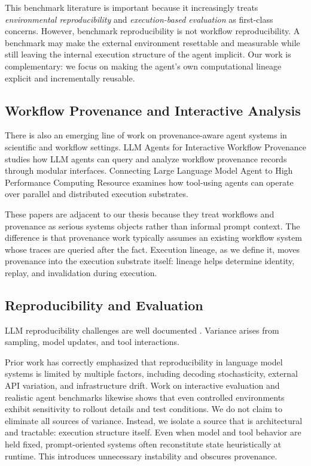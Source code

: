 \documentclass{article}
\begin{document}
This benchmark literature is important because it increasingly treats \emph{environmental reproducibility} and \emph{execution-based evaluation} as first-class concerns. However, benchmark reproducibility is not workflow reproducibility. A benchmark may make the external environment resettable and measurable while still leaving the internal execution structure of the agent implicit. Our work is complementary: we focus on making the agent's own computational lineage explicit and incrementally reusable.

\subsection{Workflow Provenance and Interactive Analysis}

There is also an emerging line of work on provenance-aware agent systems in scientific and workflow settings. LLM Agents for Interactive Workflow Provenance \cite{souza2025provenance} studies how LLM agents can query and analyze workflow provenance records through modular interfaces. Connecting Large Language Model Agent to High Performance Computing Resource \cite{ma2025hpc} examines how tool-using agents can operate over parallel and distributed execution substrates.

These papers are adjacent to our thesis because they treat workflows and provenance as serious systems objects rather than informal prompt context. The difference is that provenance work typically assumes an existing workflow system whose traces are queried after the fact. Execution lineage, as we define it, moves provenance into the execution substrate itself: lineage helps determine identity, replay, and invalidation during execution.

\subsection{Reproducibility and Evaluation}

LLM reproducibility challenges are well documented \cite{chen2023evaluating}. Variance arises from sampling, model updates, and tool interactions.

Prior work has correctly emphasized that reproducibility in language model systems is limited by multiple factors, including decoding stochasticity, external API variation, and infrastructure drift. Work on interactive evaluation \cite{abramson2022multimodal} and realistic agent benchmarks \cite{rawles2024androidworld,xie2024osworld} likewise shows that even controlled environments exhibit sensitivity to rollout details and test conditions. We do not claim to eliminate all sources of variance. Instead, we isolate a source that is architectural and tractable: execution structure itself. Even when model and tool behavior are held fixed, prompt-oriented systems often reconstitute state heuristically at runtime. This introduces unnecessary instability and obscures provenance.
\end{document}
